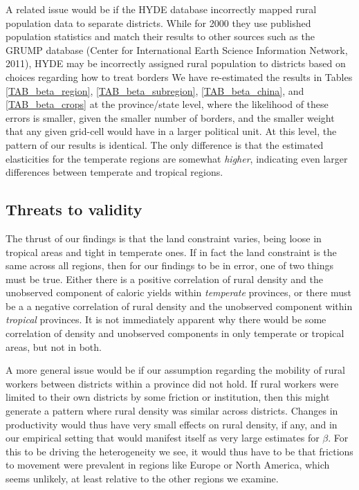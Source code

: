 \documentclass[11pt]{article}
\begin{document}
A related issue would be if the HYDE database incorrectly mapped rural population data to separate districts. While for 2000 they use published population statistics and match their results to other sources such as the GRUMP database \nocite{GRUMP} (Center for International Earth Science Information Network, 2011), HYDE may be incorrectly assigned rural population to districts based on choices regarding how to treat borders We have re-estimated the results in Tables \ref{TAB_beta_region}, \ref{TAB_beta_subregion}, \ref{TAB_beta_china}, and \ref{TAB_beta_crops} at the province/state level, where the likelihood of these errors is smaller, given the smaller number of borders, and the smaller weight that any given grid-cell would have in a larger political unit. At this level, the pattern of our results is identical. The only difference is that the estimated elasticities for the temperate regions are somewhat \textit{higher}, indicating even larger differences between temperate and tropical regions.

\subsection{Threats to validity}
The thrust of our findings is that the land constraint varies, being loose in tropical areas and tight in temperate ones. If in fact the land constraint is the same across all regions, then for our findings to be in error, one of two things must be true. Either there is a positive correlation of rural density and the unobserved component of caloric yields within \textit{temperate} provinces, or there must be a a negative correlation of rural density and the unobserved component within \textit{tropical} provinces. It is not immediately apparent why there would be some correlation of density and unobserved components in only temperate or tropical areas, but not in both.

A more general issue would be if our assumption regarding the mobility of rural workers between districts within a province did not hold. If rural workers were limited to their own districts by some friction or institution, then this might generate a pattern where rural density was similar across districts. Changes in productivity would thus have very small effects on rural density, if any, and in our empirical setting that would manifest itself as very large estimates for $\beta$. For this to be driving the heterogeneity we see, it would thus have to be that frictions to movement were prevalent in regions like Europe or North America, which seems unlikely, at least relative to the other regions we examine. 
\end{document}
